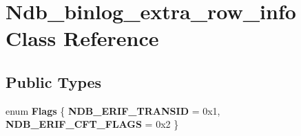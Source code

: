 \hypertarget{classNdb__binlog__extra__row__info}{}\section{Ndb\+\_\+binlog\+\_\+extra\+\_\+row\+\_\+info Class Reference}
\label{classNdb__binlog__extra__row__info}
\subsection*{Public Types}
\begin{DoxyCompactItemize}
\item 
\mbox{\label{classNdb__binlog__extra__row__info_ae293983c75f3f7a9942f7ca18ef727a5}} 
enum {\bfseries Flags} \{ {\bfseries N\+D\+B\+\_\+\+E\+R\+I\+F\+\_\+\+T\+R\+A\+N\+S\+ID} = 0x1, 
{\bfseries N\+D\+B\+\_\+\+E\+R\+I\+F\+\_\+\+C\+F\+T\+\_\+\+F\+L\+A\+GS} = 0x2
 \}
\end{DoxyCompactItemize}
